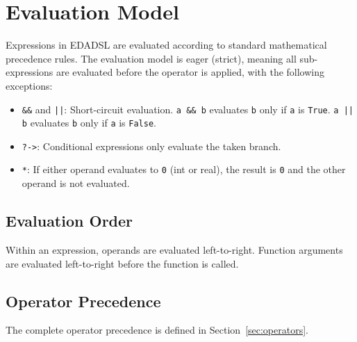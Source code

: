 \chapter{Evaluation Model} %
Expressions in EDADSL are evaluated according to standard mathematical precedence rules. The evaluation model is eager (strict), meaning all sub-expressions are evaluated before the operator is applied, with the following exceptions:

\begin{itemize}
\item \texttt{\&\&} and \texttt{||}: Short-circuit evaluation. \texttt{a \&\& b} evaluates \texttt{b} only if \texttt{a} is \texttt{True}. \texttt{a || b} evaluates \texttt{b} only if \texttt{a} is \texttt{False}.
\item \texttt{?->}: Conditional expressions only evaluate the taken branch.
\item \texttt{*}: If either operand evaluates to \texttt{0} (int or real), the result is \texttt{0} and the other operand is not evaluated.
\end{itemize}

\section{Evaluation Order}
Within an expression, operands are evaluated left-to-right. Function arguments are evaluated left-to-right before the function is called.

\section{Operator Precedence}
The complete operator precedence is defined in Section~\ref{sec:operators}.


